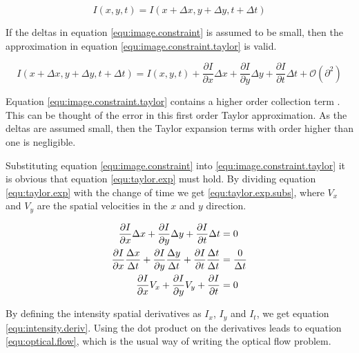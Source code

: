 \begin{equation}\label{equ:image.constraint}
	I(x,y,t) = I(x + \Delta x, y+ \Delta y, t + \Delta t)
\end{equation}

If the deltas in equation \eqref{equ:image.constraint} is assumed to be small, then the approximation in equation \eqref{equ:image.constraint.taylor} is valid.

\begin{equation}\label{equ:image.constraint.taylor}
	I(x + \Delta x, y+ \Delta y, t + \Delta t) = I(x,y,t) + \frac{\partial I}{\partial x} \Delta x + 
		\frac{\partial I}{\partial y} \Delta y + \frac{\partial I}{\partial t} \Delta t + \mathcal{O}(\partial^2)
\end{equation}

Equation \eqref{equ:image.constraint.taylor} contains a higher order collection term 
. This can be thought of the error in this first order Taylor approximation. As
the deltas are assumed small, then the Taylor expansion terms with order higher than one is negligible. 

Substituting equation \eqref{equ:image.constraint} into \eqref{equ:image.constraint.taylor} it is obvious that equation \eqref{equ:taylor.exp} must hold. 
By dividing equation \eqref{equ:taylor.exp} with the change of time we get \eqref{equ:taylor.exp.subs}, where $V_x$ and $V_y$ are the spatial velocities in the 
$x$ and $y$ direction.

\begin{align}
	\frac{\partial I}{\partial x} \Delta x + \frac{\partial I}{\partial y} \Delta y + 
		\frac{\partial I}{\partial t} \Delta t &= 0 \label{equ:taylor.exp} \\
	\frac{\partial I}{\partial x} \frac{\Delta x}{\Delta t} + \frac{\partial I}{\partial y} \frac{\Delta y}{\Delta t} + 
		\frac{\partial I}{\partial t} \frac{\Delta t}{\Delta t} &= \frac{0}{\Delta t} \notag \\
	\frac{\partial I}{\partial x} V_x + \frac{\partial I}{\partial y} V_y + \frac{\partial I}{\partial t}  &= 0 \label{equ:taylor.exp.subs}
\end{align}

By defining the intensity spatial derivatives as $I_x$, $I_y$ and $I_t$, we get equation \eqref{equ:intensity.deriv}. Using the dot product on the derivatives 
leads to equation \eqref{equ:optical.flow}, which is the usual way of writing the optical flow problem.


